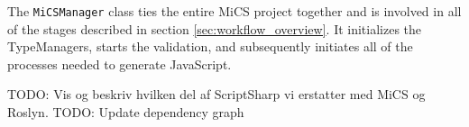 The \texttt{MiCSManager} class ties the entire MiCS project together and is involved in all of the stages described in section \ref{sec:workflow_overview}. It initializes the TypeManagers, starts the validation, and subsequently initiates all of the processes needed to generate JavaScript. 

TODO: Vis og beskriv hvilken del af ScriptSharp vi erstatter med MiCS og Roslyn.
TODO: Update dependency graph

